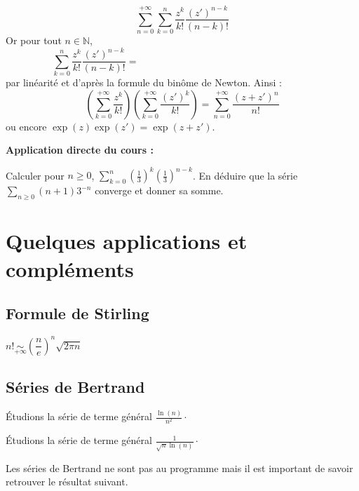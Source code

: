 \documentclass[french,11pt,twoside]{VcCours}
\newenvironment{ApplicationDirecte}{\textbf{Application directe du cours :}

}{}
\newcommand{\Sum}[2]{\ensuremath{\textstyle{\sum\limits_{#1}^{#2}}}}
\begin{document}
$$\sum_{n=0}^{+ \infty} \sum_{k=0}^n  \frac{z^k}{k!}  \frac{(z')^{n-k}}{(n-k)!}$$
Or pour tout $n \in \mathbb{N}$,
$$ \sum_{k=0}^n  \frac{z^k}{k!}  \frac{(z')^{n-k}}{(n-k)!} =  \phantom{\sum_{k=0}^n \frac{1}{n!} \binom{n}{k} z^k (z')^{n-k} = \frac{1}{n!} (z+z')^n}$$
par linéarité et d'après la formule du binôme de Newton. Ainsi :
$$ \left( \sum_{k=0}^{+ \infty} \frac{z^k}{k!} \right)\left( \sum_{k=0}^{+ \infty}  \frac{(z')^k}{k!} \right) = \sum_{n=0}^{+ \infty} \frac{(z+z')^n}{n!} $$
ou encore $\exp(z)\exp(z')=\exp(z+z')$.


\begin{ApplicationDirecte}
Calculer pour $n \geq 0$, $\Sum{k=0}{n}  \left( \frac{1}{3} \right)^k \left( \frac{1}{3} \right)^{n-k}$. En déduire que la série $\Sum{n \geq 0}{}  (n+1)3^{-n}$ converge et donner sa somme.
\end{ApplicationDirecte}

\section{Quelques applications et compléments}
\subsection{Formule de Stirling}

\begin{Theoreme}{}
\begin{center}
$n! \underset{ + \infty}{\sim} \left( \dfrac{n}{e}\right)^n \sqrt{2 \pi n}$
\end{center}
\end{Theoreme}
\subsection{Séries de Bertrand}
\begin{Exemple} Étudions la série de terme général $\frac{\ln(n)}{n^2}\cdot$

\vspace{3cm}
\end{Exemple}

\begin{Exemple} Étudions la série de terme général $\frac{1}{\sqrt{n} \ln(n)}\cdot$

\vspace{3cm}
\end{Exemple}





Les séries de Bertrand ne sont pas au programme mais il est important de savoir retrouver le résultat suivant.
\end{document}
